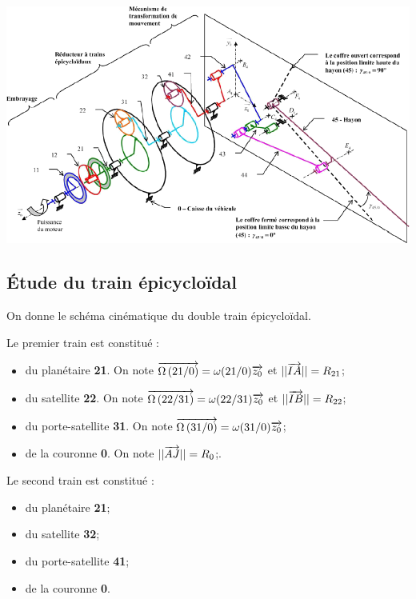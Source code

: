 \documentclass[10pt,fleqn]{article} %
\begin{document}
\begin{multicols}{2}
\begin{center}
\includegraphics[width=.95\linewidth]{images/A6_schema}
\end{center}

\fi

\subsection*{Étude du train épicycloïdal}
\ifprof
\else

On donne le schéma cinématique du double train épicycloïdal. 


Le premier train est constitué :
\begin{itemize}
\item du planétaire \textbf{21}. On note $\overrightarrow{\Omega\left( {21}/{0}\right)}=\omega(21/0)\overrightarrow{z_0}$ et $||\overrightarrow{IA}|| =R_{21} $;
\item du satellite \textbf{22}. On note $\overrightarrow{\Omega\left( {22}/{31}\right)}=\omega(22/31)\overrightarrow{z_0}$ et $||\overrightarrow{IB}|| =R_{22}$;
\item du porte-satellite \textbf{31}. On note $\overrightarrow{\Omega\left( {31}/{0}\right)}=\omega(31/0)\overrightarrow{z_0}$;
\item de la couronne \textbf{0}. On note  $||\overrightarrow{AJ}|| =R_{0}$;.
\end{itemize}
Le second train est constitué :
\begin{itemize}
\item du planétaire \textbf{21};
\item du satellite \textbf{32};
\item du porte-satellite \textbf{41};
\item de la couronne \textbf{0}.
\end{itemize}



\end{multicols}
\end{document}
